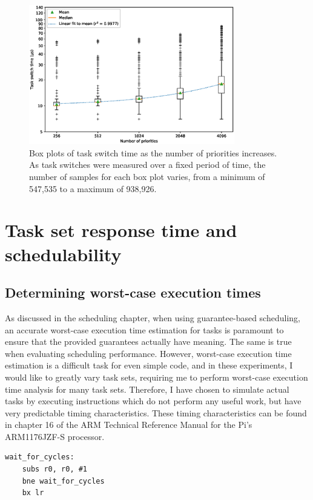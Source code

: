 \documentclass[twoside]{uva-inf-bachelor-thesis}
\begin{document}
\begin{figure}[htpb]
    \centering
    \includegraphics[width=0.8\textwidth]{boxplot.eps}
    \caption{Box plots of task switch time as the number of priorities increases. As task switches were measured over a fixed period of time, the number of samples for each box plot varies, from a minimum of 547,535 to a maximum of 938,926.}
    \label{fig:prioboxplot}
\end{figure}

\section{Task set response time and schedulability}
\subsection{Determining worst-case execution times}
As discussed in the scheduling chapter, when using guarantee-based scheduling, an accurate worst-case execution time estimation for tasks is paramount to ensure that the provided guarantees actually have meaning. The same is true when evaluating scheduling performance. However, worst-case execution time estimation is a difficult task for even simple code, and in these experiments, I would like to greatly vary task sets, requiring me to perform worst-case execution time analysis for many task sets. Therefore, I have chosen to simulate actual tasks by executing instructions which do not perform any useful work, but have very predictable timing characteristics. These timing characteristics can be found in chapter 16 of the ARM Technical Reference Manual for the Pi's ARM1176JZF-S processor\cite{arm:arm1176}.

\begin{lstlisting}
wait_for_cycles:
    subs r0, r0, #1
    bne wait_for_cycles
    bx lr
\end{lstlisting}
\end{document}
